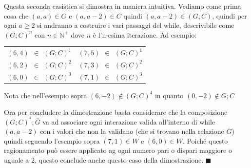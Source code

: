 \begin{demostration}
    Questa seconda casistica si dimostra in maniera intuitiva. Vediamo come prima cosa che $(a,a) \in G$ e $(a,a-2) \in C$ quindi $(a,a-2) \in (G;C)$, quindi per ogni $a \geq 2$ si andranno a costruire i vari passaggi del while, descrivibile come $(G;C)^n$ con $n \in \mathbb{N}^+$ dove $n$ è l'n-esima iterazione. Ad esempio:
    \begin{table}[h!]
        \centering
        \begin{tabular}{c c}
            $(6,4) \: \: \in \: \: (G;C)^1$ & $(7,5) \: \: \in \: \: (G;C)^1$  \\
            $(6,2) \: \: \in \: \: (G;C)^2$ & $(7,3) \: \: \in \: \: (G;C)^2$  \\
            $(6,0) \: \: \in \: \: (G;C)^3$ & $(7,1) \: \: \in \: \: (G;C)^3$ 
        \end{tabular}
    \end{table}
    \begin{note}
    \vspace{-10pt}
    Nota che nell'esempio sopra $(6, -2) \notin (G;C)^4$ in quanto $(0, -2) \notin G;C$
    \end{note}
    Ora per concludere la dimostrazione basta considerare che la composizione $(G;C)^\ast;\overline{G}$ va ad associare ogni interazione valida all'interno di while $(a,a-2)$ con i valori che non la validano (che si trovano nella relazione $\overline{G}$) quindi seguendo l'esempio sopra $(7,1) \in W$ e $(6,0) \in W$. Poiché questo ragionamento può essere applicato ag ogni numero pari o dispari maggiore o uguale a $2$, questo conclude anche questo caso della dimostrazione. $\blacksquare$
\end{demostration}

